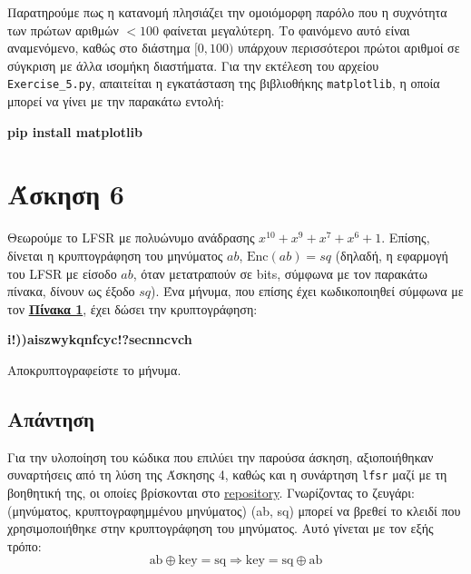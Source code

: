 \documentclass[12pt]{article}
\begin{document}
Παρατηρούμε πως η κατανομή πλησιάζει την ομοιόμορφη παρόλο που η συχνότητα των πρώτων 
αριθμών \( < 100 \) φαίνεται μεγαλύτερη. Το φαινόμενο αυτό είναι αναμενόμενο, καθώς στο 
διάστημα 
\( [0,100) \) υπάρχουν περισσότεροι πρώτοι αριθμοί σε σύγκριση με άλλα ισομήκη διαστήματα. 
\newline
\newline
Για την εκτέλεση του αρχείου \texttt{Exercise\_5.py}, απαιτείται η εγκατάσταση της 
βιβλιοθήκης \texttt{matplotlib}, η οποία μπορεί να γίνει με την παρακάτω εντολή:
\begin{center}
    \textbf{pip install matplotlib} 
\end{center}
\hfill \blacksquare
\section*{Άσκηση 6}
Θεωρούμε το LFSR με πολυώνυμο ανάδρασης \( x^{10} + x^9 + x^7 + x^6 + 1 \). 
Επίσης, δίνεται η κρυπτογράφηση του μηνύματος \( ab \), \( \text{Enc}(ab) = sq \)
(δηλαδή, η εφαρμογή του LFSR με είσοδο \( ab \), όταν μετατραπούν σε bits, σύμφωνα με τον παρακάτω πίνακα, δίνουν ως έξοδο \( sq \)). 
Ένα μήνυμα, που επίσης έχει κωδικοποιηθεί σύμφωνα με τον \textbf{\protect\hyperref[πίνακας 1]{Πίνακα 1}}, έχει δώσει την κρυπτογράφηση:

\begin{center}
    \textbf{i!))aiszwykqnfcyc!?secnncvch}
\end{center}

Αποκρυπτογραφείστε το μήνυμα.

\subsection*{Απάντηση}
Για την υλοποίηση του κώδικα που επιλύει την παρούσα άσκηση, αξιοποιήθηκαν συναρτήσεις από τη λύση της Άσκησης 4, καθώς και η συνάρτηση \texttt{lfsr} μαζί με τη βοηθητική της, οι οποίες βρίσκονται στο \href{https://github.com/drazioti/python_scripts/blob/master/numtheory/lfsr_project.py}{repository}.
\newline
\newline
Γνωρίζοντας το ζευγάρι: (μηνύματος, κρυπτογραφημμένου μηνύματος) (ab, sq) μπορεί να βρεθεί το κλειδί που χρησιμοποιήθηκε στην κρυπτογράφηση του μηνύματος. Αυτό γίνεται με τον εξής τρόπο:
\[
\text{ab} \oplus \text{key} = \text{sq} \Rightarrow \text{key} = \text{sq} \oplus \text{ab}  
\]
\end{document}
